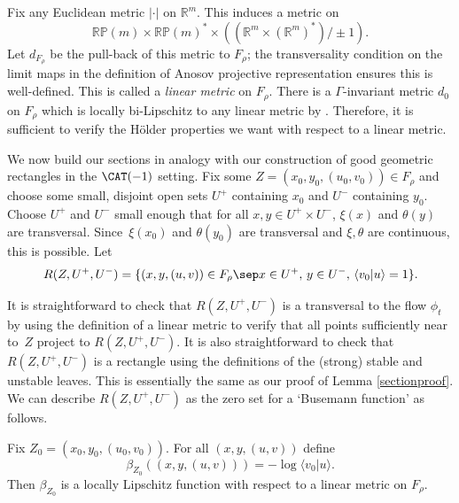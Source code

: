 Fix any Euclidean metric $|\cdot|$ on $\mathbb{R}^m$. This induces a metric on\vspace*{-3pt}\enlargethispage{\baselineskip}%
\[ \mathbb{RP}(m) \times \mathbb{RP}(m)^* \times ((\mathbb{R}^m \times (\mathbb{R}^m)^*)/\pm1).\]
Let $d_{F_\rho}$ be the pull-back of this metric to $F_\rho$; the transversality condition on the limit maps in the definition of Anosov projective representation ensures this is well-defined. This is called a \emph{linear metric} on $F_\rho$. There is a $\Gamma$-invariant metric $d_0$ on $F_\rho$ which is locally bi-Lipschitz to any linear metric by \cite[Lem.\,5.2]{bcls}. Therefore, it is sufficient to verify the Hölder properties we want with respect to a linear metric.

We now build our sections in analogy with our construction of good geometric rectangles in the $\CAT(-1)$ setting. Fix some $Z = (x_0,y_0,(u_0,v_0)) \in F_\rho$ and choose some small, disjoint open sets $U^+$ containing $x_0$ and $U^-$ containing $y_0$. Choose $U^+$ and $U^-$ small enough that for all $x,y\in U^+\times U^-$, $\xi(x)$ and $\theta(y)$ are transversal. Since~$\xi(x_0)$ and $\theta(y_0)$ are transversal and $\xi, \theta$ are continuous, this is possible.
Let
\[ R(Z,U^+,U^-) = \{ (x,y,(u,v))\in F_\rho \sep x\in U^+,\, y\in U^-,\, \langle v_0 | u \rangle =1\}.\]

It is straightforward to check that $R(Z,U^+,U^-)$ is a transversal to the flow $\phi_t$ by using the definition of a linear metric to verify that all points sufficiently near to~$Z$ project to $R(Z,U^+,U^-)$. It is also straightforward to check that $R(Z,U^+,U^-)$ is a rectangle using the definitions of the (strong) stable and unstable leaves. This is essentially the same as our proof of Lemma \ref{sectionproof}. We can describe $R(Z,U^+,U^-)$ as the zero set for a `Busemann function' as follows.

\begin{lem}\label{lem:beta Lipschitz}
Fix $Z_0=(x_0,y_0,(u_0,v_0))$. For all $(x,y,(u,v))$ define\vspace*{-3pt}
\[ \beta_{Z_0}((x,y,(u,v))) = -\log\langle v_0 | u\rangle.\]
Then $\beta_{Z_0}$ is a locally Lipschitz function with respect to a linear metric on $F_\rho$.
\end{lem}


